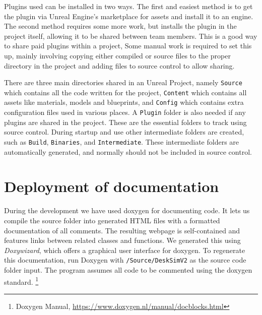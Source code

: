 Plugins used can be installed in two ways. The first and easiest method is to get the plugin via Unreal Engine's marketplace for assets and install it to an engine. The second method requires some more work, but installs the plugin in the project itself, allowing it to be shared between team members. This is a good way to share paid plugins within a project, Some manual work is required to set this up, mainly involving copying either compiled or source files to the proper directory in the project and adding files to source control to allow sharing. 

There are three main directories shared in an Unreal Project, namely \verb|Source| which contains all the \cpp code written for the project, \verb|Content| which contains all assets like materials, models and blueprints, and \verb|Config| which contains extra configuration files used in various places. A \verb|Plugin| folder is also needed if any plugins are shared in the project. These are the essential folders to track using source control. During startup and use other intermediate folders are created, such as \verb|Build|, \verb|Binaries|, and \verb|Intermediate|. These intermediate folders are automatically generated, and normally should not be included in source control.

\section{Deployment of documentation}

During the development we have used \Gls{doxygen} for documenting code. It lets us compile the source folder into generated HTML files with a formatted documentation of all comments. The resulting webpage is self-contained and features links between related classes and functions. We generated this using \textit{Doxywizard}, which offers a graphical user interface for \Gls{doxygen}. To regenerate this documentation, run Doxygen with \verb|/Source/DeskSimV2| as the source code folder input. The program assumes all code to be commented using the \Gls{doxygen} standard. \footnote{Doxygen Manual, \url{https://www.doxygen.nl/manual/docblocks.html}}
